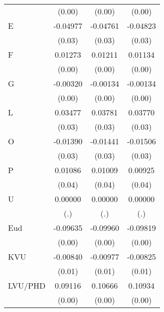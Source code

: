 \begin{table}[htbp]
\begin{tabular}{l*{3}{c}}
                    &      (0.00)         &      (0.00)         &      (0.00)         \\
E                   &    -0.04977         &    -0.04761         &    -0.04823         \\
                    &      (0.03)         &      (0.03)         &      (0.03)         \\
F                   &     0.01273\sym{**} &     0.01211\sym{**} &     0.01134\sym{**} \\
                    &      (0.00)         &      (0.00)         &      (0.00)         \\
G                   &    -0.00320\sym{*}  &    -0.00134         &    -0.00134         \\
                    &      (0.00)         &      (0.00)         &      (0.00)         \\
L                   &     0.03477         &     0.03781         &     0.03770         \\
                    &      (0.03)         &      (0.03)         &      (0.03)         \\
O                   &    -0.01390         &    -0.01441         &    -0.01506         \\
                    &      (0.03)         &      (0.03)         &      (0.03)         \\
P                   &     0.01086         &     0.01009         &     0.00925         \\
                    &      (0.04)         &      (0.04)         &      (0.04)         \\
U                   &     0.00000         &     0.00000         &     0.00000         \\
                    &         (.)         &         (.)         &         (.)         \\
Eud                 &    -0.09635\sym{***}&    -0.09960\sym{***}&    -0.09819\sym{***}\\
                    &      (0.00)         &      (0.00)         &      (0.00)         \\
KVU                 &    -0.00840         &    -0.00977         &    -0.00825         \\
                    &      (0.01)         &      (0.01)         &      (0.01)         \\
LVU/PHD             &     0.09116\sym{***}&     0.10666\sym{***}&     0.10934\sym{***}\\
                    &      (0.00)         &      (0.00)         &      (0.00)         \\

\end{tabular}
\end{table}
